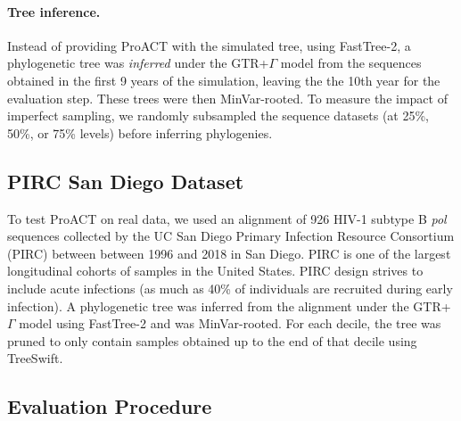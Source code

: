 \documentclass[a4paper,11pt]{article}
\newcommand{\PLWH}{sample\xspace}
\begin{document}
\paragraph{Tree inference. }
Instead of providing ProACT with the simulated tree, 
using FastTree-2,\supercite{Price2010}
a phylogenetic tree was \textit{inferred} under the GTR+$\Gamma$  model from the sequences obtained in the first 9 years of the simulation, leaving the the 10th year for the evaluation step.
These trees were then MinVar-rooted.\supercite{Mai2017}
To measure the impact of imperfect sampling, we randomly subsampled the sequence datasets (at 25\%, 50\%, or 75\% levels)  before inferring phylogenies.

\subsection{PIRC San Diego Dataset}
To test ProACT on real data, we used an alignment of 926 HIV-1 subtype B \textit{pol} sequences  collected by the UC San Diego Primary Infection Resource Consortium (PIRC) between between 1996 and 2018 in San Diego.
PIRC  is one of the largest longitudinal cohorts of \PLWH{s} in the United States. PIRC design strives to include acute infections (as much as 40\% of individuals are recruited during  early  infection).  
A phylogenetic tree was inferred from the alignment under the GTR+$\Gamma$ model using FastTree-2\supercite{Price2010} and was MinVar-rooted.\supercite{Mai2017} For each decile, the tree was pruned to only contain samples obtained up to the end of that decile using TreeSwift.\supercite{Moshiri2020} %

\subsection{Evaluation Procedure}
\end{document}
